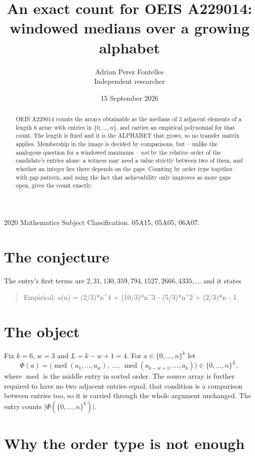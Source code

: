 \documentclass[11pt,a4paper]{article}
\title{An exact count for OEIS A229014: windowed medians over a growing alphabet}
\author{Adrian Perez Fontelles\\ \small Independent researcher}
\date{15 September 2026}
\theoremstyle{plain}
\theoremstyle{definition}
\begin{document}
\maketitle

\begin{abstract}
OEIS A229014 counts the arrays obtainable as the medians of $3$ adjacent elements of a length
$6$ array with entries in $\{0,\dots,n\}$, and carries an empirical polynomial for that
count. The length is fixed and it is the ALPHABET that grows, so no transfer matrix applies.
Membership in the image is decided by comparisons, but -- unlike the analogous question for a
windowed maximum -- \emph{not} by the relative order of the candidate's entries alone: a
witness may need a value strictly between two of them, and whether an integer lies there depends
on the gaps. Counting by order type together with gap pattern, and using the fact that
achievability only improves as more gaps open, gives the count exactly.
\end{abstract}

\noindent\small 2020 Mathematics Subject Classification. 05A15, 05A05, 06A07.\normalsize

\section{The conjecture}

The entry's first terms are $2, 31, 130, 359, 794, 1527, 2666, 4335,\dots$ and it states

\begin{quote}\raggedright Empirical: a(n) = (2/3)*n\^{}4 + (10/3)*n\^{}3 - (5/3)*n\^{}2 + (2/3)*n - 1.\end{quote}

\section{The object}

Fix $k=6$, $w=3$ and $L=k-w+1=4$. For $a\in\{0,\dots,n\}^k$ let
\[
  \Phi(a)=\bigl(\operatorname{med}(a_1,\dots,a_w),\ \dots,\
  \operatorname{med}(a_{k-w+1},\dots,a_k)\bigr)\in\{0,\dots,n\}^{L} ,
\]
where $\operatorname{med}$ is the middle entry in sorted order. The source array is further required to have no two adjacent entries equal; that condition is a comparison between entries too, so it is carried through the whole argument unchanged. The entry counts
$\lvert\Phi(\{0,\dots,n\}^k)\rvert$.

\section{Why the order type is not enough}
\end{document}
